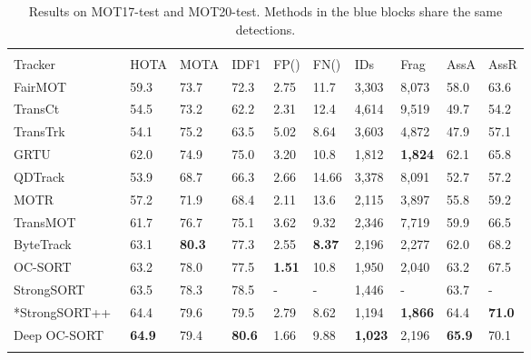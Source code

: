 \documentclass{article}
\newcommand*{\belowrulesepcolor}[1]{\noalign{\kern-\belowrulesep 
    \begingroup 
      \color{#1}\hrule height\belowrulesep 
    \endgroup 
  }}
\newcommand*{\aboverulesepcolor}[1]{\noalign{\begingroup 
      \color{#1}\hrule height\aboverulesep 
    \endgroup 
    \kern-\aboverulesep 
  }}
\begin{document}
\begin{table*}[t]
\centering
\caption{Results on MOT17-test and MOT20-test. Methods in the blue blocks share the same detections.}
\setlength{\tabcolsep}{7pt}
\scriptsize
\begin{tabular}{ l | p{20px}p{20px}p{20px}p{27px} p{27px}p{22px}p{22px}p{20px}p{20px}}
\toprule
\belowrulesepcolor{gray!20} 
\rowcolor{gray!20} \multicolumn{10}{c}{\textbf{MOT17}}
\\
\aboverulesepcolor{gray!20} 
\midrule
Tracker &  HOTA & MOTA & IDF1 &  FP({\footnotesize }) & FN({\footnotesize }) & IDs & Frag & AssA & AssR \\
\midrule
FairMOT~\cite{zhang2021fairmot} & 59.3 & 73.7 & 72.3  & 2.75 & 11.7 & 3,303 & 8,073 & 58.0 & 63.6\\
TransCt~\cite{transcenter} & 54.5 & 73.2 & 62.2  & 2.31 & 12.4 & 4,614 & 9,519 & 49.7 & 54.2 \\
TransTrk~\cite{sun2020transtrack} & 54.1 & 75.2 & 63.5  & 5.02 & 8.64 & 3,603 & 4,872 & 47.9 & 57.1 \\
GRTU~\cite{grtu} & 62.0 & 74.9 & 75.0  & 3.20 & 10.8 & 1,812 & \textbf{1,824} & 62.1 & 65.8\\ 
QDTrack~\cite{pang2021quasi} & 53.9 & 68.7 & 66.3  & 2.66 & 14.66 & 3,378 & 8,091 & 52.7 & 57.2\\
MOTR~\cite{zeng2021motr} & 57.2 &71.9 & 68.4 & 2.11 & 13.6 & 2,115 & 3,897 & 55.8 & 59.2  \\
TransMOT~\cite{chu2021transmot} & 61.7 & 76.7 & 75.1 & 3.62 & 9.32 & 2,346 & 7,719 & 59.9 & 66.5 \\
\midrule
\belowrulesepcolor{babyblue!20} 
\rowcolor{babyblue!20}ByteTrack~\cite{bytetrack} & 63.1 & \textbf{80.3} & 77.3 & 2.55 &  \textbf{8.37} & 2,196 & 2,277 & 62.0 & 68.2\\
\rowcolor{babyblue!20}OC-SORT~\cite{cao2022observation} & 63.2 & 78.0 & 77.5 & \textbf{1.51} & 10.8 & 1,950 & 2,040 & 63.2 & 67.5\\
\rowcolor{babyblue!20}StrongSORT~\cite{strongsort} & 63.5 & 78.3 & 78.5 & - & - & 1,446 & - & 63.7 & -\\ 
\rowcolor{babyblue!20}*StrongSORT++~\cite{strongsort} & 64.4 & 79.6 & 79.5 & 2.79 & 8.62 & 1,194 & \textbf{1,866} & 64.4 & \textbf{71.0}\\
\rowcolor{babyblue!20}Deep OC-SORT & \textbf{64.9} & 79.4 & \textbf{80.6} & 1.66 & 9.88 & \textbf{1,023} & 2,196 & \textbf{65.9} & 70.1\\ 
\aboverulesepcolor{babyblue!20}
\midrule
\belowrulesepcolor{gray!20} 
\rowcolor{gray!20} \multicolumn{10}{c}{\textbf{MOT20}}

\end{tabular}
\end{table*}
\end{document}
